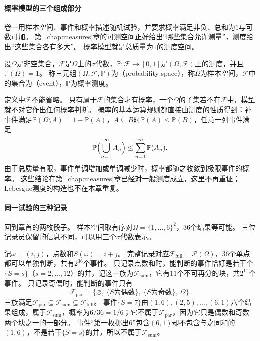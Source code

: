 \paragraph{概率模型的三个组成部分}
卷一用样本空间、事件和概率描述随机试验，并要求概率满足非负、总和为$1$与可数可加。
第~\ref{chap:measures}章的可测空间正好给出“哪些集合允许测量”，测度给出“这些集合各有多大”。
概率模型就是总质量为$1$的测度空间。

\begin{definition}[概率空间]
\label{def:pmod-probability-space}
设$\Omega$是非空集合，$\mathcal F$是$\Omega$上的$\sigma$代数，$\mathbb P:\mathcal F\to[0,1]$是$(\Omega,\mathcal F)$上的测度，并且$\mathbb P(\Omega)=1$。
称三元组$(\Omega,\mathcal F,\mathbb P)$为（probability space），称$\Omega$为样本空间，$\mathcal F$中的集合为（event），$\mathbb P$为概率测度。
\end{definition}

定义中$\mathcal F$不能省略。
只有属于$\mathcal F$的集合才有概率，一个$\Omega$的子集若不在$\mathcal F$中，模型就不对它作出任何概率判断。
概率的基本运算规则都直接由测度的性质得到：补事件满足$\mathbb P(\Omega\setminus A)=1-\mathbb P(A)$，$A\subseteq B$时$\mathbb P(A)\le\mathbb P(B)$，任意一列事件满足
\[
  \mathbb P\Bigl(\bigcup_{n=1}^\infty A_n\Bigr)\le\sum_{n=1}^\infty\mathbb P(A_n).
\]
由于总质量有限，事件单调增加或单调减少时，概率都随之收敛到极限事件的概率。
这些结论在第~\ref{chap:measures}章已经对一般测度成立，这里不再重证；Lebesgue测度的构造也不在本章重复。

\paragraph{同一试验的三种记录}
回到章首的两枚骰子。
样本空间取有序对$\Omega=\{1,\dots,6\}^2$，$36$个结果等可能。
三位记录员保留的信息不同，可以用三个$\sigma$代数表示。

\begin{example}[两枚骰子的三种观测]
\label{ex:pmod-dice-records}
记$\omega=(i,j)$，点数和$S(\omega)=i+j$。
完整记录对应$\mathcal F_{\mathrm{full}}=\mathcal P(\Omega)$，$36$个单点都可以单独判断，共有$2^{36}$个事件。
只记录点数和时，能判断的事件恰好是若干个$\{S=s\}$（$s=2,\dots,12$）的并，记这一族为$\mathcal F_{\mathrm{sum}}$，它有$11$个不可再分的块，共$2^{11}$个事件。
只记录奇偶时，能判断的事件只有
\[
  \mathcal F_{\mathrm{par}}=\bigl\{\varnothing,\ \{S\text{为偶数}\},\ \{S\text{为奇数}\},\ \Omega\bigr\}.
\]
三族满足$\mathcal F_{\mathrm{par}}\subseteq\mathcal F_{\mathrm{sum}}\subseteq\mathcal F_{\mathrm{full}}$。
事件$\{S=7\}$由$(1,6),(2,5),\dots,(6,1)$六个结果组成，属于$\mathcal F_{\mathrm{sum}}$，概率为$6/36=1/6$；它不属于$\mathcal F_{\mathrm{par}}$，因为它只是偶数和奇数两个块之一的一部分。
事件“第一枚掷出$6$”包含$(6,1)$却不包含与之同和的$(1,6)$，不是若干$\{S=s\}$的并，所以不属于$\mathcal F_{\mathrm{sum}}$。
\end{example}

